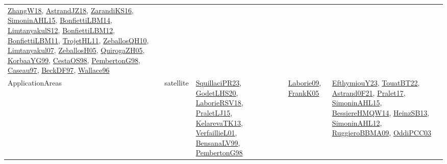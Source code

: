 {\begin{longtable}{lp{3cm}>{\raggedright}p{6cm}>{\raggedright}p{6cm}p{8cm}}
\href{articles/ZhangW18.pdf}{ZhangW18}\cite{ZhangW18}, \href{papers/AstrandJZ18.pdf}{AstrandJZ18}\cite{AstrandJZ18}, \href{articles/ZarandiKS16.pdf}{ZarandiKS16}\cite{ZarandiKS16}, \href{articles/SimoninAHL15.pdf}{SimoninAHL15}\cite{SimoninAHL15}, \href{articles/BonfiettiLBM14.pdf}{BonfiettiLBM14}\cite{BonfiettiLBM14}, \href{articles/LimtanyakulS12.pdf}{LimtanyakulS12}\cite{LimtanyakulS12}, \href{papers/BonfiettiLBM12.pdf}{BonfiettiLBM12}\cite{BonfiettiLBM12}, \href{papers/BonfiettiLBM11.pdf}{BonfiettiLBM11}\cite{BonfiettiLBM11}, \href{articles/TrojetHL11.pdf}{TrojetHL11}\cite{TrojetHL11}, \href{articles/ZeballosQH10.pdf}{ZeballosQH10}\cite{ZeballosQH10}, \href{papers/Limtanyakul07.pdf}{Limtanyakul07}\cite{Limtanyakul07}, \href{articles/ZeballosH05.pdf}{ZeballosH05}\cite{ZeballosH05}, \href{papers/QuirogaZH05.pdf}{QuirogaZH05}\cite{QuirogaZH05}, \href{papers/KorbaaYG99.pdf}{KorbaaYG99}\cite{KorbaaYG99}, \href{papers/CestaOS98.pdf}{CestaOS98}\cite{CestaOS98}, \href{papers/PembertonG98.pdf}{PembertonG98}\cite{PembertonG98}, \href{papers/Caseau97.pdf}{Caseau97}\cite{Caseau97}, \href{papers/BeckDF97.pdf}{BeckDF97}\cite{BeckDF97}, \href{articles/Wallace96.pdf}{Wallace96}\cite{Wallace96}\\
ApplicationAreas & satellite & \href{papers/SquillaciPR23.pdf}{SquillaciPR23}\cite{SquillaciPR23}, \href{papers/GodetLHS20.pdf}{GodetLHS20}\cite{GodetLHS20}, \href{articles/LaborieRSV18.pdf}{LaborieRSV18}\cite{LaborieRSV18}, \href{papers/PraletLJ15.pdf}{PraletLJ15}\cite{PraletLJ15}, \href{papers/KelarevaTK13.pdf}{KelarevaTK13}\cite{KelarevaTK13}, \href{papers/VerfaillieL01.pdf}{VerfaillieL01}\cite{VerfaillieL01}, \href{articles/BensanaLV99.pdf}{BensanaLV99}\cite{BensanaLV99}, \href{papers/PembertonG98.pdf}{PembertonG98}\cite{PembertonG98} & \href{papers/Laborie09.pdf}{Laborie09}\cite{Laborie09}, \href{papers/FrankK05.pdf}{FrankK05}\cite{FrankK05} & \href{papers/EfthymiouY23.pdf}{EfthymiouY23}\cite{EfthymiouY23}, \href{papers/TouatBT22.pdf}{TouatBT22}\cite{TouatBT22}, \href{papers/Astrand0F21.pdf}{Astrand0F21}\cite{Astrand0F21}, \href{papers/Pralet17.pdf}{Pralet17}\cite{Pralet17}, \href{articles/SimoninAHL15.pdf}{SimoninAHL15}\cite{SimoninAHL15}, \href{papers/BessiereHMQW14.pdf}{BessiereHMQW14}\cite{BessiereHMQW14}, \href{articles/HeinzSB13.pdf}{HeinzSB13}\cite{HeinzSB13}, \href{papers/SimoninAHL12.pdf}{SimoninAHL12}\cite{SimoninAHL12}, \href{articles/RuggieroBBMA09.pdf}{RuggieroBBMA09}\cite{RuggieroBBMA09}, \href{papers/OddiPCC03.pdf}{OddiPCC03}\cite{OddiPCC03}\\

\end{longtable}}
